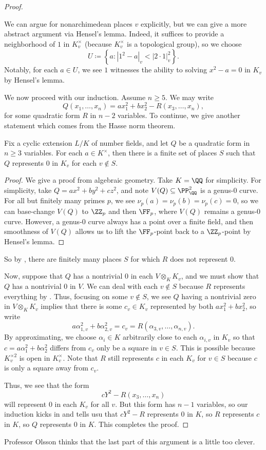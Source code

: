 \documentclass[../notes.tex]{subfiles}
\begin{document}
\begin{proof}
\begin{itemize}
		We can argue for nonarchimedean places $v$ explicitly, but we can give a more abstract argument via Hensel's lemma. Indeed, it suffices to provide a neighborhood of $1$ in $K_v^\times$ (because $K_v^\times$ is a topological group), so we choose
		\[U\coloneqq\left\{a:\left|1^2-a\right|_v<|2\cdot1|_v^2\right\}.\]
		Notably, for each $a\in U$, we see $1$ witnesses the ability to solving $x^2-a=0$ in $K_v$ by Hensel's lemma.
	\end{itemize}
	We now proceed with our induction. Assume $n\ge 5$. We may write
	\[Q(x_1,\ldots,x_n)=ax_1^2+bx_2^2-R(x_3,\ldots,x_n),\]
	for some quadratic form $R$ in $n-2$ variables. To continue, we give another statement which comes from the Hasse norm theorem.
	\begin{theorem} \label{thm:focus-on-finite-places}
		Fix a cyclic extension $L/K$ of number fields, and let $Q$ be a quadratic form in $n\ge3$ variables. For each $a\in K^\times$, then there is a finite set of places $S$ such that $Q$ represents $0$ in $K_v$ for each $v\notin S$.
	\end{theorem}
	\begin{proof}
		We give a proof from algebraic geometry. Take $K=\QQ$ for simplicity. For simplicity, take $Q=ax^2+by^2+cz^2$, and note $V(Q)\subseteq\PP^2_\QQ$ is a genus-$0$ curve. For all but finitely many primes $p$, we see $\nu_p(a)=\nu_p(b)=\nu_p(c)=0$, so we can base-change $V(Q)$ to $\ZZ_p$ and then $\FF_p$, where $V(Q)$ remains a genus-$0$ curve. However, a genus-$0$ curve always has a point over a finite field, and then smoothness of $V(Q)$ allows us to lift the $\FF_p$-point back to a $\ZZ_p$-point by Hensel's lemma.
	\end{proof}
	So by , there are finitely many places $S$ for which $R$ does not represent $0$.

	Now, suppose that $Q$ has a nontrivial $0$ in each $V\otimes_KK_v$, and we must show that $Q$ has a nontrivial $0$ in $V$. We can deal with each $v\notin S$ because $R$ represents everything by . Thus, focusing on some $v\notin S$, we see $Q$ having a nontrivial zero in $V\otimes_KK_v$ implies that there is some $c_v\in K_v$ represented by both $ax_1^2+bx_2^2$, so write
	\[a\alpha_{1,v}^2+b\alpha_{2,v}^2=c_v=R(\alpha_{3,v},\ldots,\alpha_{n,v}).\]
	By approximating,\todo{} we choose $\alpha_i\in K$ arbitrarily close to each $\alpha_{i,v}$ in $K_v$ so that $c=a\alpha_1^2+b\alpha_2^2$ differs from $c_v$ only be a square in $v\in S$. This is possible because $K_v^{\times2}$ is open in $K_v^\times$. Note that $R$ still represents $c$ in each $K_v$ for $v\in S$ because $c$ is only a square away from $c_v$.

	Thus, we see that the form
	\[cY^2-R(x_3,\ldots,x_n)\]
	will represent $0$ in each $K_v$ for all $v$. But this form has $n-1$ variables, so our induction kicks in and tells usu that $cY^2-R$ represents $0$ in $K$, so $R$ represents $c$ in $K$, so $Q$ represents $0$ in $K$. This completes the proof.
\end{proof}
\begin{remark}
	Professor Olsson thinks that the last part of this argument is a little too clever.
\end{remark}
\end{document}
